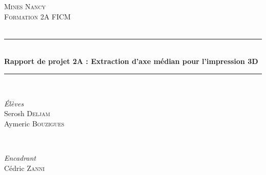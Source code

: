 \documentclass[11pt]{article}
\begin{document}

\begin{titlepage} %
	\newcommand{\HRule}{\rule{\linewidth}{0.5mm}} %
	
	\center %
	
	
	\textsc{\LARGE Mines Nancy}\\[1.5cm] %
	
	\textsc{\Large Formation 2A FICM}\\[0.5cm] %
	
	\textsc{\large }\\[0.5cm] %
	
	
	\HRule\\[0.4cm]
	
	{\huge\bfseries Rapport de projet 2A : Extraction d'axe médian pour l'impression 3D}\\[0.4cm] %
	
	\HRule\\[1.5cm]
	
	
	\begin{minipage}{0.4\textwidth}
		\begin{flushleft}
			\large
			\textit{Élèves}\\
			Serosh \textsc{Deljam} \\
			Aymeric \textsc{Bouzigues}
		\end{flushleft}
	\end{minipage}
	~
	\begin{minipage}{0.4\textwidth}
		\begin{flushright}
			\large
			\textit{Encadrant}\\
			Cédric \textsc{Zanni} %
		\end{flushright}
	\end{minipage}
	

\end{titlepage}
\end{document}
